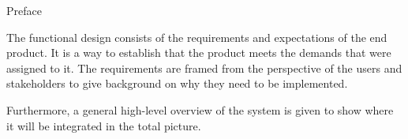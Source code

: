\documentclass{matthijs}
\begin{document}

	\thispagestyle{empty}
	
	\begin{inhoudspagina}

	\end{inhoudspagina}


	\begin{hoofdstuk}{Preface}

		The functional design consists of the requirements and expectations of the end product.
		It is a way to establish that the product meets the demands that were assigned to it.
		The requirements are framed from the perspective of the users and stakeholders to give background on why they need to be implemented.

		\bigskip

		Furthermore, a general high-level overview of the system is given to show where it will be integrated in the total picture.

	\end{hoofdstuk}
\end{document}
